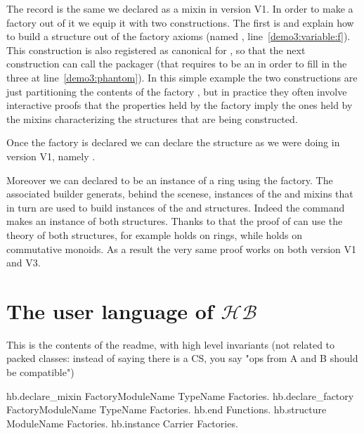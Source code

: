 \documentclass[a4paper,UKenglish,cleveref, autoref]{lipics-v2019}
\newcommand{\HB}{\ensuremath{\mathcal{HB}}}
\begin{document}
The record  is the same we declared as a mixin
in version V1. In order to make a factory out of it we equip it with
two constructions. The first is  and
explain how to build a  structure out of the factory
axioms (named , line~\ref{demo3:variable:f}).
This construction is also registered as canonical for ,
so that the next construction  can call
the  packager (that requires  to be
an  in order to fill in the three \coq{_} at
line~\ref{demo3:phantom}). In this simple example the two constructions are just
partitioning the contents of the factory , but in practice they
often involve interactive proofs that the properties held by the factory
imply the ones held by the mixins characterizing the structures that are
being constructed.

Once the factory is declared we can declare the  structure
as we were doing in version V1, namely .

Moreover we can declared  to be an instance
of a ring using the  factory.
The associated builder generats, behind the scenese, instances of the
 and  mixins
that in turn are used to build instances of the  and 
structures. Indeed the command 
makes  an instance of both structures.
Thanks to that the proof of  can use the theory of
both structures, for example  holds on rings, while  holds
on commutative monoids. As a result the very same proof works on both
version V1 and V3.

\section{The user language of \HB{}}
This is the contents of the readme, with high level invariants (not related to packed
classes: instead of saying there is a CS, you say "ops from A and B should be compatible")

\begin{coqcode}
hb.declare_mixin FactoryModuleName TypeName Factories.
hb.declare_factory FactoryModuleName TypeName Factories.
hb.end Functions.
hb.structure ModuleName Factories.
hb.instance Carrier Factories.
\end{coqcode}
\end{document}

